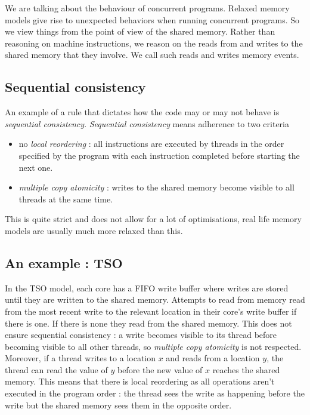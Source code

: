 \documentclass[a4,11pt,dvipsnames]{article}
\begin{document}
We are talking about the behaviour of concurrent programs. Relaxed memory models give rise to unexpected behaviors when running concurrent programs. So we view things from the point of view of the shared memory. Rather than reasoning on machine instructions, we reason on the reads from and writes to the shared memory that they involve. We call such reads and writes memory events.

\subsection{Sequential consistency}

An example of a rule that dictates how the code may or may not behave is \emph{sequential consistency}. \emph{Sequential consistency} means adherence to two criteria 
\begin{itemize}
\item no \emph{local reordering} : all instructions are executed by threads in the order specified by the program with each instruction completed before starting the next one.
\item \emph{multiple copy atomicity} : writes to the shared memory become visible to all threads at the same time.
\end{itemize}
This is quite strict and does not allow for a lot of optimisations, real life memory models are usually much more relaxed than this.

\subsection{An example : TSO}

In the TSO model, each core has a FIFO write buffer where writes are stored until they are written to the shared memory. Attempts to read from memory read from the most recent write to the relevant location in their core's write buffer if there is one. If there is none they read from the shared memory. This does not ensure sequential consistency : a write becomes visible to its thread before becoming visible to all other threads, so \emph{multiple copy atomicity} is not respected. Moreover, if a thread writes to a location $x$ and reads from a location $y$, the thread can read the value of $y$ before the new value of $x$ reaches the shared memory. This means that there is local reordering as all operations aren't executed in the program order : the thread sees the write as happening before the write but the shared memory sees them in the opposite order.
\end{document}
